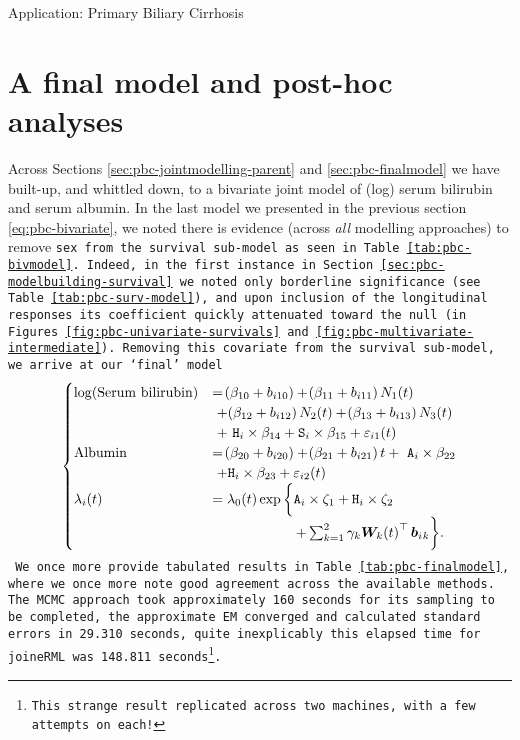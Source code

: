 \begin{chapter}{\label{cha:app-PBC}Application: Primary Biliary Cirrhosis}
  \section{A final model and post-hoc analyses}\label{sec:pbc-final-model-exploration}
  Across Sections \ref{sec:pbc-jointmodelling-parent} and \ref{sec:pbc-finalmodel} we have built-up, and whittled down, to a bivariate joint model of (log) serum bilirubin and serum albumin. In the last model we presented in the previous section \eqref{eq:pbc-bivariate}, we noted there is evidence (across \textit{all} modelling approaches) to remove \tt{sex} from the survival sub-model as seen in Table \ref{tab:pbc-bivmodel}. Indeed, in the first instance in Section \ref{sec:pbc-modelbuilding-survival} we noted only borderline significance (see Table \ref{tab:pbc-surv-model}), and upon inclusion of the longitudinal responses its coefficient quickly attenuated toward the null (\eg in Figures \ref{fig:pbc-univariate-survivals} and \ref{fig:pbc-multivariate-intermediate}). Removing this covariate from the survival sub-model, we arrive at our `final' model
  \begin{equation}
    \begin{aligned}
        \begin{cases}
            \log\lb\mathrm{Serum\ bilirubin}\rb &= \lb\beta_{10} + b_{i10}\rb + \lb\beta_{11} + b_{i11}\rb N_1(t) \\&\ + \lb\beta_{12} + b_{i12}\rb N_2(t) + \lb\beta_{13} + b_{i13}\rb N_3(t)\\&\ +\ \tt{H}_i\times\beta_{14} + \tt{S}_i\times\beta_{15} + \varepsilon_{i1}\lb t\rb\\
            \mathrm{Albumin} &= \lb\beta_{20} + b_{i20}\rb + \lb\beta_{21} + b_{i21}\rb t +\ \tt{A}_i\times\beta_{22} \\&\ + \tt{H}_i\times\beta_{23} + \varepsilon_{i2}\lb t\rb \\
            \li\lb t\rb &= \lo\lb t\rb \exp\bigg\{\tt{A}_i\times\zeta_1+\tt{H}_i\times\zeta_2\\&\qquad\qquad\qquad +\sum_{k=1}^2\gamma_k\bm{W}_k\lb t\rb^\top\b{_k}\bigg\}.
        \end{cases}
    \end{aligned}
  \label{eq:pbc-finalmodel}    
  \end{equation}
  We once more provide tabulated results in Table \ref{tab:pbc-finalmodel}, where we once more note good agreement across the available methods. The MCMC approach took approximately 160 seconds for its sampling to be completed, the approximate EM converged and calculated standard errors in 29.310 seconds, quite inexplicably this elapsed time for \tt{joineRML} was 148.811 seconds\footnote{This strange result replicated across two machines, with a few attempts on each!}.

\end{chapter}
